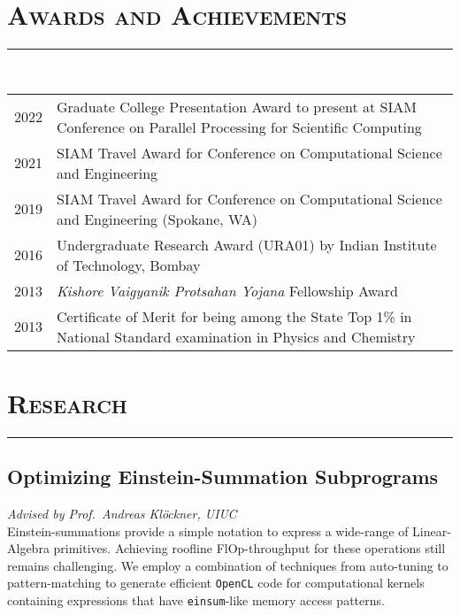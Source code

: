 \documentclass[letterpaper, 13pt]{article}
\begin{document}


\section*{\Large\textsc{Awards and Achievements}}
\vspace{-4ex}
\rule{\textwidth}{0.1ex}
\vspace{1ex}\\
\begin{tabular}{p{} p{}}
  2022    &   Graduate College Presentation Award to present at SIAM Conference
    on Parallel Processing for Scientific Computing \vspace{1ex}\\
  2021    &   SIAM Travel Award for Conference on Computational Science and
    Engineering \vspace{1ex}\\
  2019    &   SIAM Travel Award for Conference on Computational Science and
    Engineering (Spokane, WA) \vspace{1ex}\\
  2016    &   Undergraduate Research Award (URA01) by Indian Institute of
    Technology, Bombay \vspace{1ex}\\
  2013    &   \textit{Kishore Vaigyanik Protsahan Yojana} Fellowship
    Award\vspace{1ex} \\
  2013    &   Certificate of Merit for being among the State Top 1\% in National
    Standard examination in Physics and Chemistry \\
\end{tabular} 



\section*{\Large\textsc{Research}}

\vspace{-4ex}
\rule{\textwidth}{0.1ex}

\subsection*{Optimizing Einstein-Summation Subprograms}
\vspace{-1ex}
\small \textit{Advised by Prof.~Andreas Kl\"{o}ckner, UIUC}\\
Einstein-summations provide a simple notation to express a wide-range of
Linear-Algebra primitives. Achieving roofline FlOp-throughput for these
operations still remains challenging. We employ a combination of techniques
from auto-tuning to pattern-matching to generate efficient \texttt{OpenCL} code for
computational kernels containing expressions that have \texttt{einsum}-like memory
access patterns.
\end{document}
